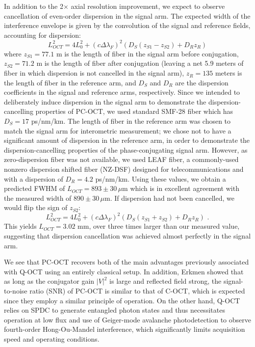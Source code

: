 In addition to the 2$\times$ axial resolution improvement, we expect to observe cancellation of even-order dispersion in the signal arm. The expected width of the interference envelope is given by the convolution of the signal and reference fields, accounting for dispersion:
\begin{equation}
L_{OCT}^2 = 4 L_0^2 + (c \Delta\lambda_F)^2 (D_S (z_{S1}-z_{S2}) + D_R z_R)
\end{equation}
where $z_{S1} = 77.1$ m is the length of fiber in the signal arm before conjugation, $z_{S2} = 71.2$ m is the length of fiber after conjugation (leaving a net 5.9 meters of fiber in which dispersion is not cancelled in the signal arm), $z_R = 135$ meters is the length of fiber in the reference arm, and $D_S$ and $D_R$ are the dispersion coefficients in the signal and reference arms, respectively. Since we intended to deliberately induce dispersion in the signal arm to demonstrate the dispersion-cancelling properties of PC-OCT, we used standard SMF-28 fiber which has $D_S = 17$ ps/nm/km. The length of fiber in the reference arm was chosen to match the signal arm for interometric measurement; we chose not to have a significant amount of dispersion in the reference arm, in order to demonstrate the dispersion-cancelling properties of the phase-conjugating signal arm. However, as zero-dispersion fiber was not available, we used LEAF fiber, a commonly-used nonzero dispersion shifted fiber (NZ-DSF) designed for telecommunications and with a dispersion of $D_R = 4.2$ ps/nm/km. Using these values, we obtain a predicted FWHM of $L_{OCT} = 893 \pm 30\,\mu$m which is in excellent agreement with the measured width of $890 \pm 30\,\mu$m. If dispersion had not been cancelled, we would flip the sign of $z_{S2}$:
\begin{equation}
L_{OCT}^2 = 4 L_0^2 + (c \Delta\lambda_F)^2 (D_S (z_{S1}+z_{S2}) + D_R z_R)\,\,.
\end{equation}
This yields $L_{OCT} = 3.02$ mm, over three times larger than our measured value, suggesting that dispersion cancellation was achieved almost perfectly in the signal arm.

We see that PC-OCT recovers both of the main advantages previously associated with Q-OCT using an entirely classical setup. In addition, Erkmen showed \cite{erkmen-thesis} that as long as the conjugator gain $|V|^2$ is large and reflected field strong, the signal-to-noise ratio (SNR) of PC-OCT is similar to that of C-OCT, which is expected since they employ a similar principle of operation. On the other hand, Q-OCT relies on SPDC to generate entangled photon states and thus necessitates operation at low flux and use of Geiger-mode avalanche photodetection to observe fourth-order Hong-Ou-Mandel interference, which significantly limits acquisition speed and operating conditions.

